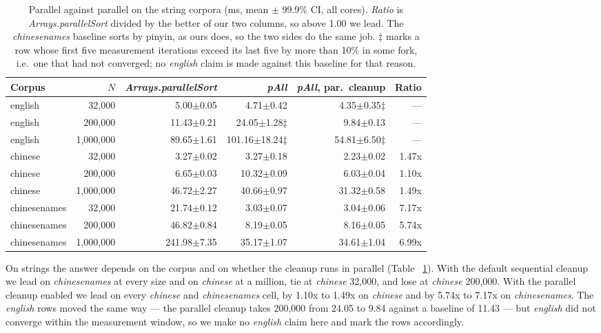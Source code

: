 \documentclass[twoside,leqno,twocolumn]{article}
\begin{document}
\begin{table}
  \caption{Parallel against parallel on the string corpora (ms, mean $\pm$ 99.9\% CI, all cores).
    \textit{Ratio} is \mbox{\textit{Arrays.parallelSort}} divided by the better of our two columns, so
    above 1.00 we lead. The \textit{chinesenames} baseline sorts by pinyin, as ours does, so the two
    sides do the same job. $\ddagger$ marks a row whose first five measurement iterations exceed its
    last five by more than 10\% in some fork, i.e.\ one that had not converged; no \textit{english}
    claim is made against this baseline for that reason.}
  \label{tab:ParallelStrings}
  \centering
  \begin{tabular}{lrrrrr}
    \toprule
    Corpus & $N$ & \textit{Arrays.parallelSort} & \textit{pAll} & \textit{pAll}, par.\ cleanup & Ratio \\
    \midrule
    english & 32,000 & 5.00$\pm$0.05 & 4.71$\pm$0.42 & 4.35$\pm$0.35$\ddagger$ & --- \\
    english & 200,000 & 11.43$\pm$0.21 & 24.05$\pm$1.28$\ddagger$ & 9.84$\pm$0.13 & --- \\
    english & 1,000,000 & 89.65$\pm$1.61 & 101.16$\pm$18.24$\ddagger$ & 54.81$\pm$6.50$\ddagger$ & --- \\
    \midrule
    chinese & 32,000 & 3.27$\pm$0.02 & 3.27$\pm$0.18 & 2.23$\pm$0.02 & 1.47x \\
    chinese & 200,000 & 6.65$\pm$0.03 & 10.32$\pm$0.09 & 6.03$\pm$0.04 & 1.10x \\
    chinese & 1,000,000 & 46.72$\pm$2.27 & 40.66$\pm$0.97 & 31.32$\pm$0.58 & 1.49x \\
    \midrule
    chinesenames & 32,000 & 21.74$\pm$0.12 & 3.03$\pm$0.07 & 3.04$\pm$0.06 & 7.17x \\
    chinesenames & 200,000 & 46.82$\pm$0.84 & 8.19$\pm$0.05 & 8.16$\pm$0.05 & 5.74x \\
    chinesenames & 1,000,000 & 241.98$\pm$7.35 & 35.17$\pm$1.07 & 34.61$\pm$1.04 & 6.99x \\
    \bottomrule
  \end{tabular}
\end{table}

On strings the answer depends on the corpus and on whether the cleanup runs in parallel
(Table ~\ref{tab:ParallelStrings}).
With the default sequential cleanup we lead on \textit{chinesenames} at every size and on
\textit{chinese} at a million, tie at \textit{chinese} 32,000, and lose at \textit{chinese} 200,000.
With the parallel cleanup enabled we lead on every \textit{chinese} and \textit{chinesenames} cell, by
1.10x to 1.49x on \textit{chinese} and by 5.74x to 7.17x on \textit{chinesenames}.
The \textit{english} rows moved the same way --- the parallel cleanup takes 200,000 from 24.05 to 9.84
against a baseline of 11.43 --- but \textit{english} did not converge within the measurement window,
so we make no \textit{english} claim here and mark the rows accordingly.
\end{document}
